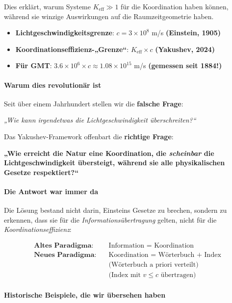\documentclass[11pt,a4paper]{article}
\begin{document}
	Dies erklärt, warum Systeme $K_{\mathrm{eff}} \gg 1$ für die Koordination haben können, während sie winzige Auswirkungen auf die Raumzeitgeometrie haben.
	\begin{itemize}
		\item \textbf{Lichtgeschwindigkeitsgrenze}: $c = 3 \times 10^8$ m/s \textbf{(Einstein, 1905)}
		\item \textbf{Koordinationseffizienz-„Grenze“}: $K_{\mathrm{eff}} \times c$ \textbf{(Yakushev, 2024)}
		\item \textbf{Für GMT}: $3.6 \times 10^6 \times c \approx 1.08 \times 10^{15}$ m/s \textbf{(gemessen seit 1884!)}
	\end{itemize}
	
	\paragraph{Warum dies revolutionär ist}
	Seit über einem Jahrhundert stellen wir die \textbf{falsche Frage}:
	\begin{center}
		\itshape „Wie kann irgendetwas die Lichtgeschwindigkeit überschreiten?“ 
	\end{center}
	
	Das Yakushev-Framework offenbart die \textbf{richtige Frage}:
	\begin{center}
		\bfseries „Wie erreicht die Natur eine Koordination, die \emph{scheinbar} die Lichtgeschwindigkeit übersteigt, während sie alle physikalischen Gesetze respektiert?“
	\end{center}
	
	\paragraph{Die Antwort war immer da}
	Die Lösung bestand nicht darin, Einsteins Gesetze zu brechen, sondern zu erkennen, dass sie für die \emph{Informationsübertragung} gelten, nicht für die \emph{Koordinationseffizienz}:
	
	\begin{align*}
		\textbf{Altes Paradigma:} & \quad \text{Information = Koordination} \\
		\textbf{Neues Paradigma:} & \quad \text{Koordination = Wörterbuch + Index} \\
		& \quad \text{(Wörterbuch a priori verteilt)} \\
		& \quad \text{(Index mit $v \leq c$ übertragen)}
	\end{align*}
	
	\paragraph{Historische Beispiele, die wir übersehen haben}
	
\end{document}
